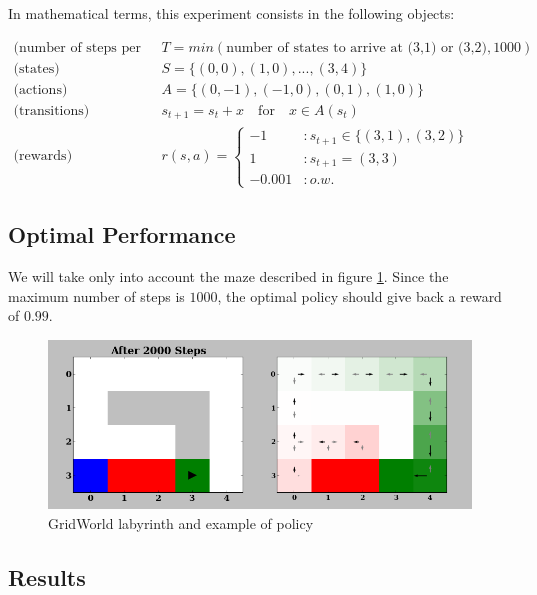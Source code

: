 \documentclass[12pt]{article}
\begin{document}
In mathematical terms, this experiment consists in the following objects:

\begin{equation}
\begin{array}{rl}
\text{(number of steps per episode)} & T = \textit{min}(\text{number of states to arrive at (3,1) or (3,2)},1000)\\
\text{(states)}&S = \{(0,0),(1,0),...,(3,4)\}\\
\text{(actions)} &A = \{(0,-1),(-1,0),(0,1),(1,0)\}\\
\text{(transitions)} &  s_{t+1} = s_t+x \quad \text{for} \quad x\in A(s_t)\\
\text{(rewards)}& r(s,a) = \left\lbrace \begin{array}{lr}
-1 & :  s_{t+1}\in \{(3,1),(3,2)\}\\
1 & :s_{t+1}=(3,3)\\
-0.001 & : o.w.

\end{array} \right.
\end{array}
\end{equation}

\subsection{Optimal Performance}
We will take only into account the maze described in figure \ref{fig:GW}. Since the maximum number of steps is $1000$, the optimal policy should give back a reward of $0.99$.
\begin{figure}[h]
\centering
\includegraphics[trim=0cm 0cm 0cm 1.1cm, clip=true, scale=.4]{gridWorld.png}
\caption{GridWorld labyrinth and example of policy}
\label{fig:GW}
\end{figure}


\subsection{Results}
\end{document}
